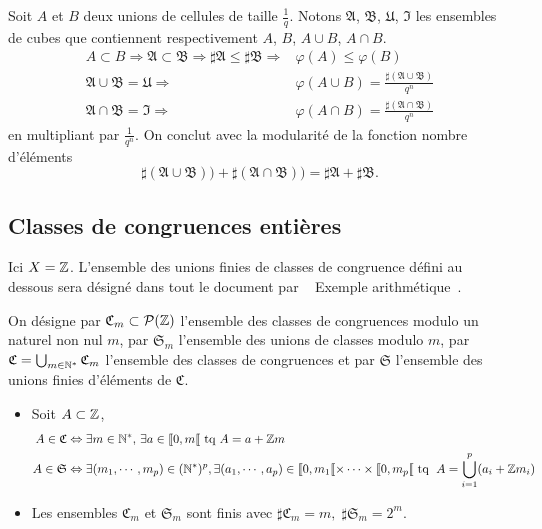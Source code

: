 \begin{demo}
 Soit $A$ et $B$ deux unions de cellules de taille $\frac{1}{q}$. Notons $\mathfrak{A}$, $\mathfrak{B}$, $\mathfrak{U}$, $\mathfrak{I}$ les ensembles de cubes que contiennent respectivement $A$, $B$, $A\cup B$, $A\cap B$.
 \begin{align*}
  A \subset B \Rightarrow \mathfrak{A} \subset \mathfrak{B} \Rightarrow \sharp\mathfrak{A} \leq \sharp \mathfrak{B} \Rightarrow& \varphi(A) \leq \varphi(B) \\
  \mathfrak{A}\cup \mathfrak{B} = \mathfrak{U} \Rightarrow& \varphi(A\cup B) = \frac{\sharp(\mathfrak{A}\cup \mathfrak{B})}{q^n} \\
  \mathfrak{A}\cap \mathfrak{B} = \mathfrak{I} \Rightarrow& \varphi(A\cap B) = \frac{\sharp(\mathfrak{A}\cap \mathfrak{B})}{q^n}
 \end{align*}
 en multipliant par $\frac{1}{q^n}$. On conclut avec la modularité de la fonction nombre d'éléments
 \begin{displaymath}
  \sharp(\mathfrak{A}\cup \mathfrak{B})) + \sharp(\mathfrak{A}\cap \mathfrak{B})) = \sharp\mathfrak{A} + \sharp \mathfrak{B}.
 \end{displaymath}
\end{demo}

\subsection{Classes de congruences entières}\label{SubSec:ClassesCongru}
Ici $X = \mathbb{Z}$. 
L'ensemble des unions finies de classes de congruence défini au dessous sera désigné dans tout le document par \og~ Exemple arithmétique~\fg{}.

\begin{defi}
On désigne par $\mathfrak{C}_m \subset \mathcal{P}(\mathbb{Z})$ l'ensemble des classes de congruences modulo un naturel non nul $m$, par $\mathfrak{S}_m$ l'ensemble des unions de classes modulo $m$, par $\mathfrak{C} = \bigcup_{m \in \mathbb{N}^*}\mathfrak{C}_m$ l'ensemble des classes de congruences et par $\mathfrak{S}$ l'ensemble des unions finies d'éléments de $\mathfrak{C}$.
\end{defi}
\begin{rems}
 \begin{itemize}
  \item Soit $A \subset \mathbb{Z}$,
  \begin{align*}
 A \in \mathfrak{C}  &\Leftrightarrow \exists m\in \mathbb{N}^*,\, \exists a \in \llbracket 0, m \llbracket \text{ tq } A = a + \mathbb{Z} m \\
 A\in \mathfrak{S} &\Leftrightarrow \exists (m_1,\cdots,m_p) \in (\mathbb{N}^*)^p, \exists (a_1,\cdots,a_p)\in \llbracket 0,m_1\llbracket \times \dots \times \llbracket 0,m_p\llbracket \text{ tq }\;
 A = \bigcup_{i=1}^{p}(a_i + \mathbb{Z} m_i)
  \end{align*}
    \item Les ensembles $\mathfrak{C}_m$ et $\mathfrak{S}_m$ sont finis avec $\sharp \mathfrak{C}_m = m, \; \sharp \mathfrak{S}_m = 2^m$.
  \end{itemize}
\end{rems}


